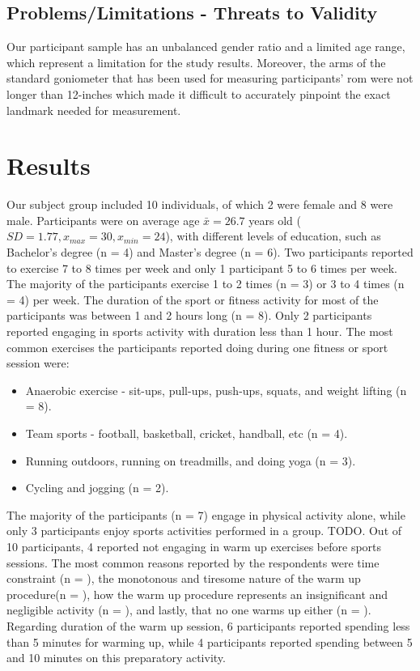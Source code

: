 \subsection{Problems/Limitations - Threats to Validity}
Our participant sample has an unbalanced gender ratio and a limited age range, which represent a limitation for the study results. Moreover, the arms of the standard goniometer that has been used for measuring participants' \acrshort{rom} were not longer than 12-inches which made it difficult to accurately pinpoint the exact landmark needed for measurement.
\section{Results}
Our subject group included 10 individuals, of which 2 were female and 8 were male. Participants were on average age \begin{math}\bar{x} = 26.7\end{math} years old (\begin{math}SD= 1.77,  x_{max}=30 ,x_{min}= 24 \end{math}), with different levels of education, such as Bachelor's degree (n = 4) and Master's degree (n = 6). Two participants reported to exercise 7 to 8 times per week and only 1 participant 5 to 6 times per week. The majority of the participants exercise 1 to 2 times (n = 3) or 3 to 4 times (n = 4) per week. The duration of the sport or fitness activity for most of the participants was between 1 and 2 hours long (n = 8). Only 2 participants reported engaging in sports activity with duration less than 1 hour. The most common exercises the participants reported doing during one fitness or sport session were:
\begin{itemize}
\item Anaerobic exercise - sit-ups, pull-ups, push-ups, squats, and weight lifting (n = 8).
\item Team sports - football, basketball, cricket, handball, etc (n = 4).
\item Running outdoors, running on treadmills, and doing yoga (n = 3).
\item Cycling and jogging (n = 2).
\end{itemize}
The majority of the participants (n = 7) engage in physical activity alone, while only 3 participants enjoy sports activities performed in a group. TODO. Out of 10 participants, 4 reported not engaging in warm up exercises before sports sessions. The most common reasons reported by the respondents were time constraint (n = ), the monotonous and tiresome nature of the warm up procedure(n = ), how the warm up procedure represents an insignificant and negligible activity (n = ), and lastly, that no one warms up either (n = ). Regarding duration of the warm up session, 6 participants reported spending less than 5 minutes for warming up, while 4 participants reported spending between 5 and 10 minutes on this preparatory activity.\\
